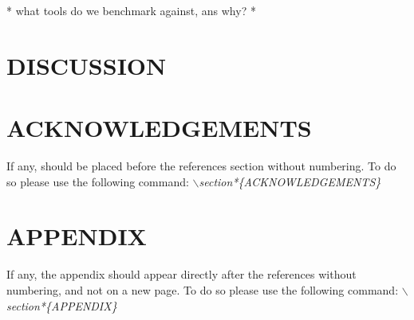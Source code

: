 \documentclass[a4paper,10pt]{article}
\newcommand{\TODO}[1]{\begingroup\color{red}#1\endgroup}
\begin{document}
\cite{oxbench}

\cite{balibase}

\TODO{* what tools do we benchmark against, ans why? *} 


\section{\uppercase{Discussion}}
\section*{\uppercase{Acknowledgements}}

\noindent If any, should be placed before the references section
without numbering. To do so please use the following command:
\textit{$\backslash$section*\{ACKNOWLEDGEMENTS\}}


\vfill

{\small
}


\section*{\uppercase{Appendix}}

\noindent If any, the appendix should appear directly after the
references without numbering, and not on a new page. To do so please use the following command:
\textit{$\backslash$section*\{APPENDIX\}}

\vfill
\end{document}
